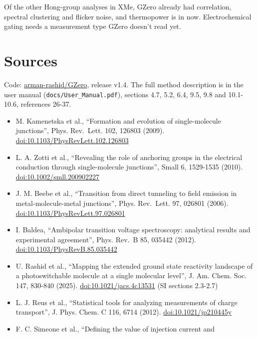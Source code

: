 \documentclass[
  11pt,
  a4paper,
]{article}
\providecommand{\tightlist}{%
  \setlength{\itemsep}{0pt}\setlength{\parskip}{0pt}}
\begin{document}
Of the other Hong-group analyses in XMe, GZero already had correlation,
spectral clustering and flicker noise, and thermopower is in now.
Electrochemical gating needs a measurement type GZero doesn't read yet.

\hypertarget{sources}{%
\section{Sources}\label{sources}}

Code: \href{https://github.com/arman-rashid/GZero}{arman-rashid/GZero},
release v1.4. The full method description is in the user manual
(\texttt{docs/\allowbreak{}User\_\allowbreak{}Manual.pdf}), sections
4.7, 5.2, 6.4, 9.5, 9.8 and 10.1-10.6, references 26-37.

\begin{itemize}
\tightlist
\item
  M. Kamenetska et al., ``Formation and evolution of single-molecule
  junctions'', Phys. Rev.~Lett. 102, 126803 (2009).
  \href{https://doi.org/10.1103/PhysRevLett.102.126803}{doi:10.1103/PhysRevLett.102.126803}
\item
  L. A. Zotti et al., ``Revealing the role of anchoring groups in the
  electrical conduction through single-molecule junctions'', Small 6,
  1529-1535 (2010).
  \href{https://doi.org/10.1002/smll.200902227}{doi:10.1002/smll.200902227}
\item
  J. M. Beebe et al., ``Transition from direct tunneling to field
  emission in metal-molecule-metal junctions'', Phys. Rev.~Lett. 97,
  026801 (2006).
  \href{https://doi.org/10.1103/PhysRevLett.97.026801}{doi:10.1103/PhysRevLett.97.026801}
\item
  I. Baldea, ``Ambipolar transition voltage spectroscopy: analytical
  results and experimental agreement'', Phys. Rev.~B 85, 035442 (2012).
  \href{https://doi.org/10.1103/PhysRevB.85.035442}{doi:10.1103/PhysRevB.85.035442}
\item
  U. Rashid et al., ``Mapping the extended ground state reactivity
  landscape of a photoswitchable molecule at a single molecular level'',
  J. Am. Chem. Soc. 147, 830-840 (2025).
  \href{https://doi.org/10.1021/jacs.4c13531}{doi:10.1021/jacs.4c13531}
  (SI sections 2.3-2.7)
\item
  L. J. Reus et al., ``Statistical tools for analyzing measurements of
  charge transport'', J. Phys. Chem. C 116, 6714 (2012).
  \href{https://doi.org/10.1021/jp210445y}{doi:10.1021/jp210445y}
\item
  F. C. Simeone et al., ``Defining the value of injection current and

\end{itemize}
\end{document}
